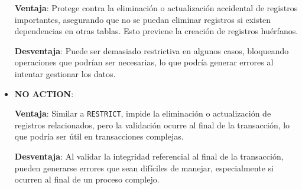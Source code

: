 \begin{itemize}
    \textbf{Ventaja}: Protege contra la eliminación o actualización accidental de registros importantes, asegurando que no se puedan eliminar registros si existen dependencias en otras tablas. Esto previene la creación de registros huérfanos.
    
    \textbf{Desventaja}: Puede ser demasiado restrictiva en algunos casos, bloqueando operaciones que podrían ser necesarias, lo que podría generar errores al intentar gestionar los datos.
    
    \vspace{0.5cm}
    
    \item \textbf{NO ACTION}:
    
    \textbf{Ventaja}: Similar a \texttt{RESTRICT}, impide la eliminación o actualización de registros relacionados, pero la validación ocurre al final de la transacción, lo que podría ser útil en transacciones complejas.
    
    \textbf{Desventaja}: Al validar la integridad referencial al final de la transacción, pueden generarse errores que sean difíciles de manejar, especialmente si ocurren al final de un proceso complejo.

    \vspace{0.5cm}
    
\end{itemize}
